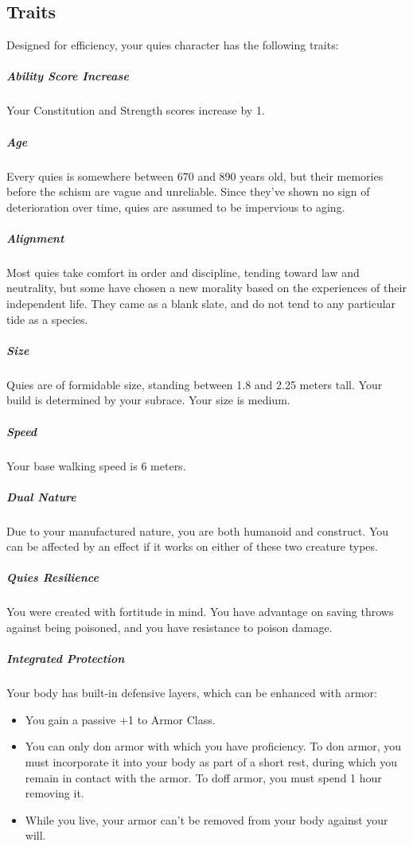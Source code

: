 \subsection*{Traits}
    Designed for efficiency, your quies character has the following traits:

    \subparagraph{Ability Score Increase} Your Constitution and Strength scores increase by 1.

    \subparagraph{Age} Every quies is somewhere between 670 and 890 years old, but their memories before the schism are vague and unreliable.
    Since they've shown no sign of deterioration over time, quies are assumed to be impervious to aging.

    \subparagraph{Alignment} Most quies take comfort in order and discipline, tending toward law and neutrality, but some have chosen a new morality based on the experiences of their independent life.
    They came as a blank slate, and do not tend to any particular tide as a species.

    \subparagraph{Size} Quies are of formidable size, standing between 1.8 and 2.25 meters tall.
    Your build is determined by your subrace.
    Your size is medium.

    \subparagraph{Speed} Your base walking speed is 6 meters.

    \subparagraph{Dual Nature} Due to your manufactured nature, you are both humanoid and construct.
    You can be affected by an effect if it works on either of these two creature types.

    \subparagraph{Quies Resilience} You were created with fortitude in mind.
    You have advantage on saving throws against being poisoned, and you have resistance to poison damage.

    \subparagraph{Integrated Protection} Your body has built-in defensive layers, which can be enhanced with armor:

    \begin{itemize}
        \item You gain a passive +1 to Armor Class.
        \item You can only don armor with which you have proficiency.
        To don armor, you must incorporate it into your body as part of a short rest, during which you remain in contact with the armor.
        To doff armor, you must spend 1 hour removing it.
        \item While you live, your armor can't be removed from your body against your will.
    \end{itemize}

